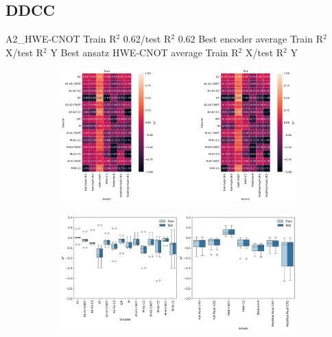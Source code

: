 \documentclass[journal=jacsat,manuscript=article]{achemso}
\begin{document}
\begin{figure}[H]
\begin{subfigure}[b]{0.49\textwidth}
		\caption{}
		\label{fig:BSE16_learningcurve}
	\end{subfigure}
	\caption{}
	\label{fig:BSE_LC}	
\end{figure}







\subsection{DDCC}


A2\_HWE-CNOT Train R$^{2}$ 0.62/test R$^{2}$ 0.62 
Best encoder average Train R$^{2}$ X/test R$^{2}$ Y
Best ansatz HWE-CNOT average Train R$^{2}$ X/test R$^{2}$ Y

\begin{figure}[H]
	\centering	
	\begin{subfigure}[b]{0.49\textwidth}
		\centering
		\includegraphics[width=\linewidth]{../images/DDCC/DDCC_heatplots}
		\caption{}
		\label{fig:ddccheatplots}
	\end{subfigure}
	\hfill	
	\begin{subfigure}[b]{0.49\textwidth}
		\centering
		\includegraphics[width=\linewidth]{../images/DDCC/DDCC_boxplots}
		\caption{}
		\label{fig:ddccboxplots}
	\end{subfigure}
	\hfill
	\caption{}
	\label{fig:ddcc_all_analysis}	
\end{figure}
\end{document}
